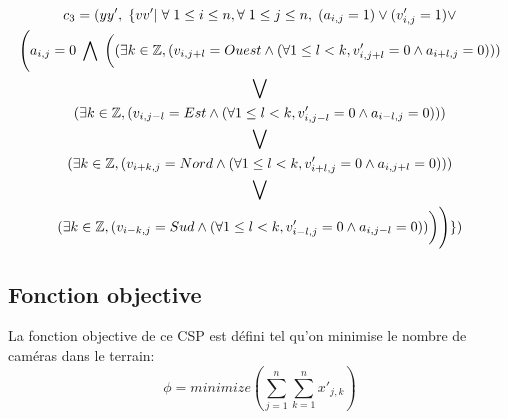 \documentclass[a4paper,11pt]{article}
\begin{document}
\begin{itemize}
  \begin{multline}
    c_{3} = ( yy',\hspace{0.1cm} \{ vv' |\hspace{0.1cm} \forall \hspace{0.1cm} 1\leq i \leq n, \forall \hspace{0.1cm} 1\leq j \leq n, \hspace{0.1cm} (a_{i,j}=1) \vee (v'_{i,j} = 1) \vee \\ \Bigg(a_{i,j} = 0\hspace{0.1cm} \bigwedge \hspace{0.1cm} \bigg(
    (\exists k \in \mathbb{Z} , (v_ {i,j+l} = Ouest \wedge (\forall 1 \leq l < k, v'_{i,j+l}=0
    \wedge a_{i+l,j}=0))) \\
    \bigvee \\
    (\exists k \in \mathbb{Z} , (v_ {i,j-l} = Est \wedge (\forall 1 \leq l < k, v'_{i,j-l}=0
    \wedge a_{i-l,j}=0))) \\
    \bigvee \\
    (\exists k \in \mathbb{Z} , (v_ {i+k,j} = Nord \wedge (\forall 1 \leq l < k, v'_{i+l,j}=0
    \wedge a_{i,j+l}=0))) \\
    \bigvee \\
    (\exists k \in \mathbb{Z} , (v_ {i-k,j} = Sud \wedge (\forall 1 \leq l < k, v'_{i-l,j}=0
    \wedge a_{i,j-l}=0))\bigg)
    \Bigg)\}
    )
  \end{multline}
  
\end{itemize}

\subsection{Fonction objective}

La fonction objective de ce CSP est défini tel qu'on minimise le nombre de caméras dans le terrain:
  $$ \phi = minimize(\sum_{j=1}^{n} \sum_{k=1}^n x'_{j,k}) $$

  
\end{document}

